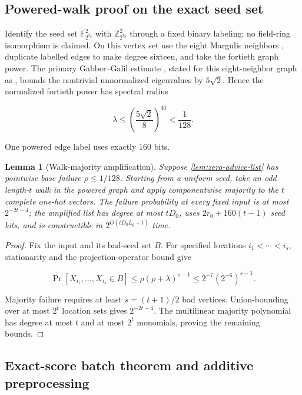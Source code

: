 \documentclass[11pt,letterpaper]{article}
\newcommand{\cref}[1]{\ref{#1}}
\newtheorem{lemma}[theorem]{Lemma}
\theoremstyle{definition}
\theoremstyle{remark}
\begin{document}
\subsection{Powered-walk proof on the exact seed
set}\label{a11-powered-walk-proof-on-the-exact-seed-set}

Identify the seed set \(\mathbb F_{2^{r_0}}^2\) with
\(\mathbb Z_{2^{r_0}}^2\) through a fixed binary labeling; no field-ring
isomorphism is claimed. On this vertex set use the eight Margulis
neighbors \cite{Marg73}, duplicate labelled edges to make degree sixteen, and take the
fortieth graph power. The primary Gabber--Galil estimate \cite{GG81},
stated for this eight-neighbor graph as \cite[Theorem 8.2]{HLW06}, bounds
the nontrivial unnormalized eigenvalues by \(5\sqrt2\). Hence the
normalized fortieth power has spectral radius

\[
\lambda
\le
\left(\frac{5\sqrt2}{8}\right)^{40}
{}<{}
\frac1{128}.
\]

One powered edge label uses exactly \(160\) bits.

\begin{lemma}[Walk-majority amplification]
\label{lem:walk-amplification}
Suppose \cref{lem:zero-advice-list} has pointwise base failure
\(\rho\le1/128\). Starting from a
uniform seed, take an odd length-\(t\) walk in the powered graph and
apply componentwise majority to the \(t\) complete one-hot vectors. The
failure probability at every fixed input is at most \(2^{-2t-4}\); the
amplified list has degree at most \(tD_0\), uses \(2r_0+160(t-1)\) seed
bits, and is constructible in \(2^{O(tD_0L_q+t)}\) time.
\end{lemma}

\begin{proof} Fix the input and its bad-seed set \(B\). For specified
locations \(i_1<\cdots<i_s\), stationarity and the projection-operator
bound give

\[
\Pr[X_{i_1},\ldots,X_{i_s}\in B]
\le
\rho(\rho+\lambda)^{s-1}
\le
2^{-7}(2^{-6})^{s-1}.
\]

Majority failure requires at least \(s=(t+1)/2\) bad vertices.
Union-bounding over at most \(2^t\) location sets gives \(2^{-2t-4}\).
The multilinear majority polynomial has degree at most \(t\) and at most
\(2^t\) monomials, proving the remaining bounds. \end{proof}

\subsection{Exact-score batch theorem and additive
preprocessing}\label{a12-exact-score-batch-theorem-and-additive-preprocessing}
\end{document}
